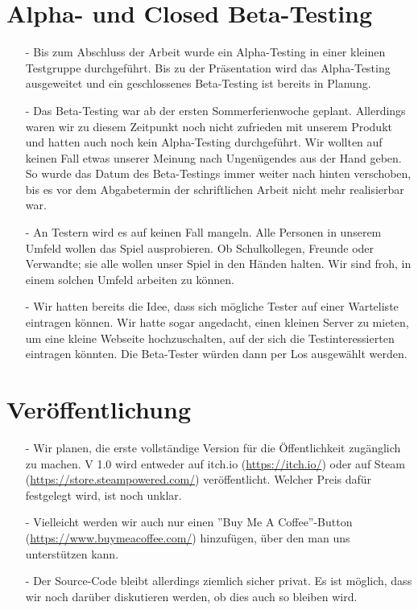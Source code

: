 \section{Alpha- und Closed Beta-Testing}
\begin{itemize}
    \item[-] Bis zum Abschluss der Arbeit wurde ein Alpha-Testing in einer kleinen Testgruppe durchgeführt. Bis zu der Präsentation wird
    das Alpha-Testing ausgeweitet und ein geschlossenes Beta-Testing ist bereits in Planung. 
    \item[-] Das Beta-Testing war ab der ersten Sommerferienwoche geplant. Allerdings waren wir zu diesem Zeitpunkt noch nicht zufrieden mit unserem Produkt und hatten auch noch kein Alpha-Testing durchgeführt. Wir wollten
    auf keinen Fall etwas unserer Meinung nach Ungenügendes aus der Hand geben. So wurde das Datum des Beta-Testings immer weiter nach hinten verschoben, bis es vor dem Abgabetermin der schriftlichen Arbeit nicht mehr realisierbar war.
    \item[-] An Testern wird es auf keinen Fall mangeln. Alle Personen in unserem Umfeld wollen
    das Spiel ausprobieren. Ob Schulkollegen, Freunde oder Verwandte; sie alle wollen unser Spiel in den Händen halten. Wir sind froh, in einem solchen Umfeld arbeiten zu können.
    \item[-] Wir hatten bereits die Idee, dass sich mögliche Tester auf einer Warteliste eintragen können. Wir hatte sogar angedacht, einen kleinen Server zu mieten,
    um eine kleine Webseite hochzuschalten, auf der sich die Testinteressierten eintragen könnten. Die Beta-Tester würden dann per Los ausgewählt werden.
\end{itemize}

\section{Veröffentlichung}
\begin{itemize}
    \item[-] Wir planen, die erste vollständige Version für die Öffentlichkeit zugänglich zu machen. V 1.0 wird entweder auf itch.io (\url{https://itch.io/}) oder auf \gls{Steam} 
    (\url{https://store.steampowered.com/}) veröffentlicht. Welcher Preis dafür festgelegt wird, ist noch unklar.
    \item[-] Vielleicht werden wir auch nur einen ''Buy Me A Coffee''-Button (\url{https://www.buymeacoffee.com/}) hinzufügen, über den man uns unterstützen kann. 
    \item[-] Der Source-Code bleibt allerdings ziemlich sicher privat. Es ist möglich, dass wir noch darüber diskutieren werden, ob dies auch so bleiben wird.
\end{itemize}




